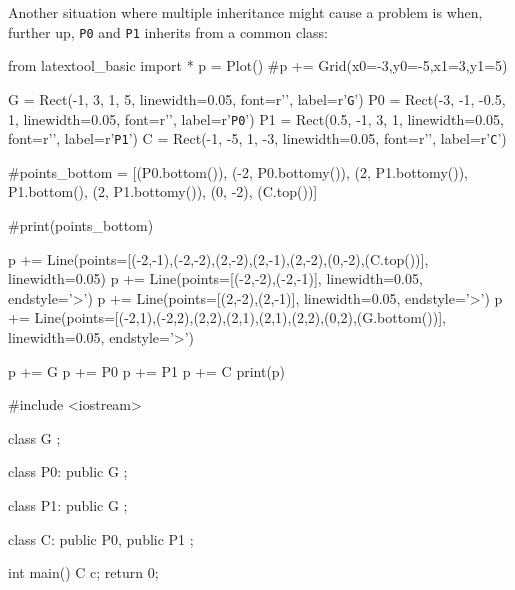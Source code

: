 Another situation where multiple inheritance might cause a problem is
when, further up, \verb!P0! and \verb!P1! inherits from a common class:
\begin{python}
from latextool_basic import *
p = Plot()
#p += Grid(x0=-3,y0=-5,x1=3,y1=5)

G = Rect(-1, 3, 1, 5, linewidth=0.05, font=r'\huge', label=r'\texttt{G}')
P0 = Rect(-3, -1, -0.5, 1, linewidth=0.05, font=r'\huge', label=r'\texttt{P0}')
P1 = Rect(0.5, -1, 3, 1, linewidth=0.05, font=r'\huge', label=r'\texttt{P1}')
C = Rect(-1, -5, 1, -3, linewidth=0.05, font=r'\huge', label=r'\texttt{C}')

#points_bottom = [(P0.bottom()), (-2, P0.bottomy()), (2, P1.bottomy()), P1.bottom(), (2, P1.bottomy()), (0, -2), (C.top())]

#print(points_bottom)

p += Line(points=[(-2,-1),(-2,-2),(2,-2),(2,-1),(2,-2),(0,-2),(C.top())], linewidth=0.05)
p += Line(points=[(-2,-2),(-2,-1)], linewidth=0.05, endstyle='>')
p += Line(points=[(2,-2),(2,-1)], linewidth=0.05, endstyle='>')
p += Line(points=[(-2,1),(-2,2),(2,2),(2,1),(2,1),(2,2),(0,2),(G.bottom())], linewidth=0.05, endstyle='>')


p += G
p += P0
p += P1
p += C
print(p)
\end{python}
\begin{console}
#include <iostream>

class G
{};

class P0: public G
{};

class P1: public G
{};

class C: public P0, public P1
{};

int main()
{   
    C c;
    return 0;
}
\end{console}

